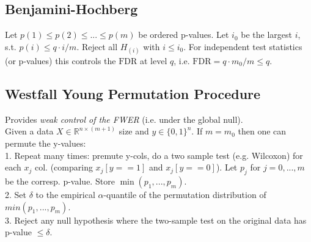 \subsection*{Benjamini-Hochberg}
Let $p(1)\leq p(2) \leq ... \leq p(m)$ be ordered p-values. Let $i_0$ be the largest $i$, s.t. $p(i)\leq q\cdot i / m$. Reject all $H_{(i)}$ with $i\leq i_0$. For independent test statistics (or p-values) this controls the $\text{FDR}$ at level $q$, i.e. $\text{FDR}=q\cdot m_0 / m \leq q$. 
\subsection*{Westfall Young Permutation Procedure}
Provides \textit{weak control of the FWER} (i.e. under the global null). \\
Given a data $X \in \mathbb{R}^{n\times (m+1)}$ size and $y\in \{0,1\}^n$. If $m=m_0$ then one can permute the y-values:\\
1. Repeat many times: premute y-cols, do a two sample test (e.g. Wilcoxon) for each $x_j$ col. (comparing $x_j[y==1]$ and $x_j[y==0]$). Let $p_j$ for $j=0,...,m$ be the corresp. p-value. Store $\min(p_1,...,p_m)$.\\
2. Set $\delta$ to the empirical $\alpha$-quantile of the permutation distribution of $min(p_1,...,p_m)$. \\
3. Reject any null hypothesis where the two-sample test on the original data has p-value $\leq \delta$.\\

